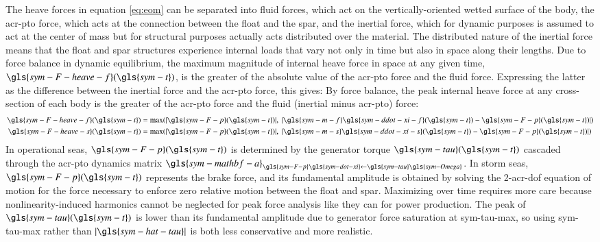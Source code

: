\ifdefined\DISSERTATION
    The heave forces in equation \eqref{eq:eom} can be separated into fluid forces, which act on the vertically-oriented wetted surface of the body, the \gls{acr-pto} force, which acts at the connection between the float and the spar, and the inertial force, which for dynamic purposes is assumed to act at the center of mass but for structural purposes actually acts distributed over the material.
    The distributed nature of the inertial force means that the float and spar structures experience internal loads that vary not only in time but also in space along their lengths.
    Due to force balance in dynamic equilibrium, the maximum magnitude of internal heave force in space at any given time, $\gls{sym-F-heave-f}(\gls{sym-t})$, is the greater of the absolute value of the \gls{acr-pto} force and the fluid force.
    Expressing the latter as the difference between the inertial force and the \gls{acr-pto} force, this gives:
\else
    By force balance, the peak internal heave force at any cross-section of each body is the greater of the \gls{acr-pto} force and the fluid (inertial minus \gls{acr-pto}) force:
\fi
\begin{equation}\label{eq:heave-force-decomp}
\begin{aligned}
    \gls{sym-F-heave-f} (\gls{sym-t}) &=\max\!\left(|\gls{sym-F-p} (\gls{sym-t})|,~ |\gls{sym-m-f}\gls{sym-ddot-xi-f} (\gls{sym-t})-\gls{sym-F-p} (\gls{sym-t})|\right) \\
    \gls{sym-F-heave-s} (\gls{sym-t}) &=\max\!\left(|\gls{sym-F-p} (\gls{sym-t})|,~ |\gls{sym-m-s}\gls{sym-ddot-xi-s} (\gls{sym-t})-\gls{sym-F-p} (\gls{sym-t})|\right)
\end{aligned}
\end{equation}
In operational seas, $\gls{sym-F-p}(\gls{sym-t})$ is determined by the generator torque $\gls{sym-tau}(\gls{sym-t})$ cascaded through the \gls{acr-pto} dynamics matrix $\gls{sym-mathbf-a}_{\gls{sym-F-p}\gls{sym-dot-xi}\leftarrow \gls{sym-tau}\gls{sym-Omega}}$.
In storm seas, $\gls{sym-F-p}(\gls{sym-t})$ represents the brake force, and its fundamental amplitude is obtained by solving the 2-\gls{acr-dof} equation of motion for the force necessary to enforce zero relative motion between the float and spar.
\ifdefined\DISSERTATION
    Maximizing over time requires more care because nonlinearity-induced harmonics cannot be neglected for peak force analysis like they can for power production.
    The peak of $\gls{sym-tau}(\gls{sym-t})$ is lower than its fundamental amplitude due to generator force saturation at \gls{sym-tau-max}, so using \gls{sym-tau-max} rather than $|\gls{sym-hat-tau}|$ is both less conservative and more realistic.
